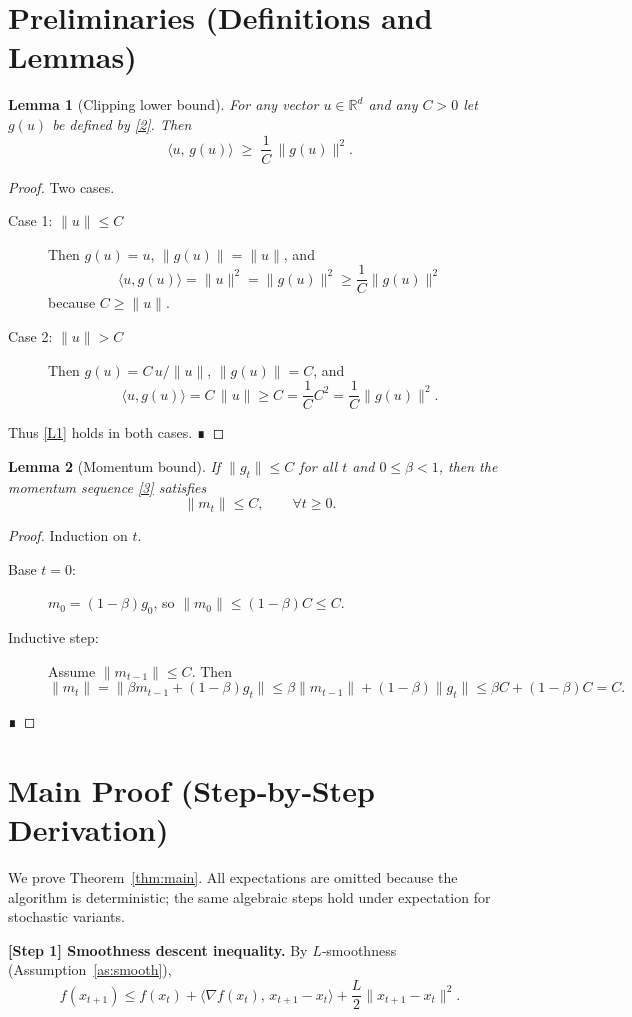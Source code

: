\documentclass{article}
\newtheorem{lemma}{Lemma}
\newcommand{\R}{\mathbb{R}}
\begin{document}
\section*{Preliminaries (Definitions and Lemmas)}
\begin{lemma}[Clipping lower bound]\label{lem:clip-lb}
For any vector $u\in\R^{d}$ and any $C>0$ let $g(u)$ be defined by \eqref{2}. Then
\[
\langle u,\, g(u)\rangle \;\ge\; \frac{1}{C}\,\|g(u)\|^{2}.
\tag{L1}
\]
\end{lemma}
\begin{proof}
Two cases.
\begin{description}
\item[Case 1: $\|u\|\le C$]  Then $g(u)=u$, $\|g(u)\|=\|u\|$, and
\[
\langle u,g(u)\rangle =\|u\|^{2}= \|g(u)\|^{2}\ge\frac{1}{C}\|g(u)\|^{2}
\]
because $C\ge\|u\|$.
\item[Case 2: $\|u\|>C$]  Then $g(u)=C\,u/\|u\|$, $\|g(u)\|=C$, and
\[
\langle u,g(u)\rangle = C\,\|u\|\ge C = \frac{1}{C}C^{2}= \frac{1}{C}\|g(u)\|^{2}.
\]
\end{description}
Thus \eqref{L1} holds in both cases. ∎
\end{proof}

\begin{lemma}[Momentum bound]\label{lem:bound}
If $\|g_t\|\le C$ for all $t$ and $0\le\beta<1$, then the momentum sequence \eqref{3} satisfies
\[
\|m_t\|\le C,\qquad\forall t\ge0 .
\tag{L2}
\]
\end{lemma}
\begin{proof}
Induction on $t$.
\begin{description}
\item[Base $t=0$:] $m_0=(1-\beta)g_0$, so $\|m_0\|\le (1-\beta)C\le C$.
\item[Inductive step:] Assume $\|m_{t-1}\|\le C$. Then
\[
\|m_t\| =\|\beta m_{t-1}+(1-\beta)g_t\|
\le \beta\|m_{t-1}\|+(1-\beta)\|g_t\|
\le \beta C+(1-\beta)C = C .
\]
\end{description}
∎
\end{proof}

\section*{Main Proof (Step‑by‑Step Derivation)}
We prove Theorem~\ref{thm:main}. All expectations are omitted because the algorithm is deterministic; the same algebraic steps hold under expectation for stochastic variants.

\bigskip
\noindent\textbf{[Step 1] Smoothness descent inequality.}  
By $L$‑smoothness (Assumption~\ref{as:smooth}),
\[
f(x_{t+1})\le f(x_t)+\langle\nabla f(x_t),\,x_{t+1}-x_t\rangle
+\frac{L}{2}\|x_{t+1}-x_t\|^{2}.
\tag{1.1}
\]
\end{document}
